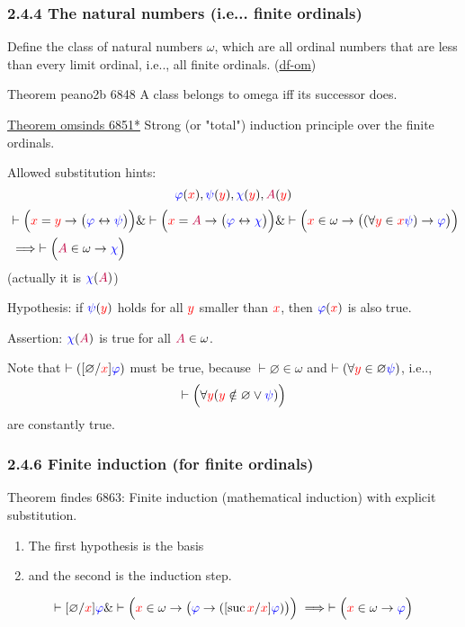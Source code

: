\documentclass[12pt, letterpaper]{article}
\makeatletter
\newcommand\ie{i.e\@ifnextchar.{}{.\@}}
\newcommand{\red}[1]{{\color{red} #1}}
\newcommand{\blue}[1]{{\color{blue} #1}}
\newcommand{\purple}[1]{{\color{purple} #1}}
\renewcommand{\emptyset}{\varnothing}
\newcommand{\provable}{\vdash}
\newcommand{\ra}{\rightarrow}
\newcommand{\lra}{\leftrightarrow}
\newcommand{\setvar}{\red}
\newcommand{\wff}{\blue}
\newcommand{\classvar}{\purple}
\newcommand{\wffphi}{\wff{\varphi}}
\newcommand{\wffpsi}{\wff{\psi}}
\newcommand{\wffchi}{\wff{\chi}}
\newcommand{\sx}{\setvar{x}}
\newcommand{\sy}{\setvar{y}}
\newcommand{\clA}{\classvar{A}}
\newcommand{\suc}{{\operatorname{suc}\,}}
\theoremstyle{definition}
\theoremstyle{remark}
\theoremstyle{definition}
\theoremstyle{plain}
\makeatother
\begin{document}
	\subsubsection*{2.4.4  The natural numbers (\ie. finite ordinals)}
	Define the class of natural numbers $\omega$,
	which are all ordinal numbers that are less than every limit ordinal, \ie, all finite ordinals.
	(\href{http://us.metamath.org/mpeuni/mmtheorems69.html#mm6832s}{df-om})
	
	Theorem	peano2b 6848	A class belongs to omega iff its successor does. 
	
	\href{http://us.metamath.org/mpeuni/omsinds.html}{Theorem	omsinds 6851*}	Strong (or "total") induction principle over the finite ordinals.
	
	Allowed substitution hints:   \[\wffphi(\sx),   \wffpsi(\sy) ,  \wffchi(\sy)  , \clA(\sy)\]
	\[\begin{aligned}
		&\provable \Big(\sx=\sy\ra\big(\wffphi\lra\wffpsi\big) \Big)
		\& \provable \Big( \sx=\clA \ra \big(\wffphi\lra\wffchi
		\big)\Big) \&
		\provable \Big( \sx\in\omega \ra \big( (\forall\sy\in\sx\wffpsi)\ra\wffphi\big)\Big)\\
		&\implies
		\provable \Big(\clA\in\omega\ra\wffchi\Big)
	\end{aligned}
	 \]
	 (actually it is $\wffchi(\clA)$)
	 
	 Hypothesis: if $\wffpsi(\sy)$ holds for all $\sy$ smaller than $\sx$,
	 then $\wffphi(\sx)$ is also true.
	 
	 Assertion: $\wffchi(\clA)$ is true for all $\clA\in\omega$.
	 
	 Note that $\provable([\emptyset/\sx]\wffphi)$ must be true, because $\provable\emptyset\in\omega$
	 and $\provable(\forall\sy\in\emptyset\wffpsi)$, \ie,
	 \[\provable\Big(\forall \sy(\sy\notin\emptyset \lor \wffpsi) \Big)\]
	 are constantly true.
	 
	\subsubsection*{2.4.6  Finite induction (for finite ordinals)}
	Theorem	findes 6863:
	Finite induction (mathematical induction) with explicit substitution.
	\begin{enumerate}
		\item 	The first hypothesis is the basis
		\item and the second is the induction step.
	\end{enumerate}
	\[\provable[\emptyset/\sx]\wffphi
	\& \provable \Big(\sx\in\omega\ra \big( \wffphi\ra ([\suc\sx/\sx]\wffphi)\big) \Big)
	\implies \provable \Big(\sx\in\omega\ra\wffphi\Big)
	 \]
	 
\end{document}
